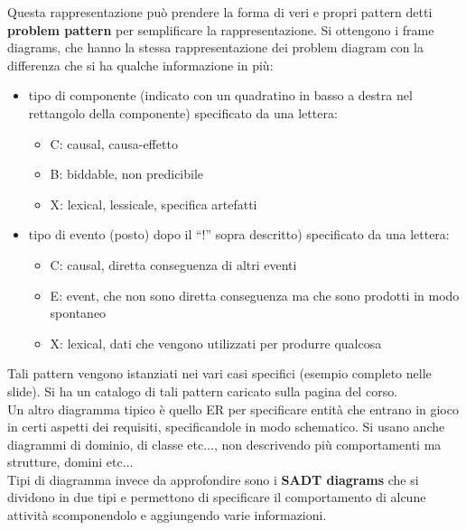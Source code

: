 \documentclass[a4paper,12pt, oneside]{book}
\begin{document}
Questa rappresentazione può prendere la forma di veri e propri pattern detti
\textbf{problem pattern} per semplificare la rappresentazione. Si ottengono i
frame diagrams, che hanno la stessa rappresentazione dei problem diagram con la
differenza che si ha qualche informazione in più:
\begin{itemize}
  \item tipo di componente (indicato con un quadratino in basso a destra nel
  rettangolo della componente) specificato da una lettera:
  \begin{itemize}
    \item C: causal, causa-effetto
    \item B: biddable, non predicibile
    \item X: lexical, lessicale, specifica artefatti
  \end{itemize}
  \item tipo di evento (posto) dopo il ``!'' sopra descritto) specificato da una
  lettera: 
  \begin{itemize}
    \item C: causal, diretta conseguenza di altri eventi
    \item E: event, che non sono diretta conseguenza ma che sono prodotti in modo
    spontaneo 
    \item X: lexical, dati che vengono utilizzati per produrre qualcosa
  \end{itemize}
\end{itemize}
Tali pattern vengono istanziati nei vari casi specifici (esempio completo nelle
slide). Si ha un catalogo di tali pattern caricato sulla pagina del corso.\\
Un altro diagramma tipico è quello ER per specificare entità che entrano in
gioco in certi aspetti dei requisiti, specificandole in modo schematico. Si
usano anche diagrammi di dominio, di classe etc$\ldots$, non descrivendo più
comportamenti ma strutture, domini etc$\ldots$\\
Tipi di diagramma invece da approfondire sono i \textbf{SADT diagrams} che si
dividono in due tipi e permettono di specificare il comportamento di alcune
attività scomponendolo e aggiungendo varie informazioni.
\end{document}
